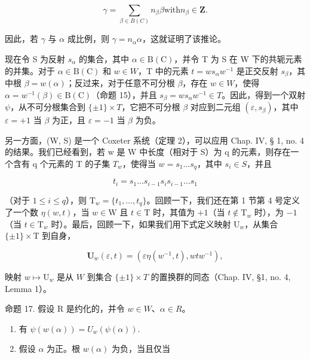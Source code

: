 \[
\gamma = \sum_ {\beta \in B (C)} n _ {\beta} \beta \text {with} n _ {\beta} \in \mathbf {Z}.
\]

因此，若 \(\gamma\) 与 \(\alpha\) 成比例，则 \(\gamma = n_{\alpha}\alpha\)，这就证明了该推论。

现在令 S 为反射 \(s_{\alpha}\) 的集合，其中 \(\alpha \in \mathrm{B}(\mathrm{C})\)，并令 T 为 S 在 W 下的共轭元素的并集。对于 \(\alpha \in \mathrm{B}(\mathrm{C})\) 和 \(w \in W\)，T 中的元素 \(t = ws_{\alpha}w^{-1}\) 是正交反射 \(s_{\beta}\)，其中根 \(\beta = w(\alpha)\)；反过来，对于任意不可分根 \(\beta\)，存在 \(w \in W\)，使得 \(\alpha = w^{-1}(\beta) \in \mathrm{B}(\mathrm{C})\)（命题 15），并且 \(s_{\beta} = ws_{\alpha}w^{-1} \in T\)。因此，得到一个双射 \(\psi\)，从不可分根集合到 \(\{\pm1\} \times T\)，它把不可分根 \(\beta\) 对应到二元组 \((\varepsilon, s_{\beta})\)，其中 \(\varepsilon = +1\) 当 \(\beta\) 为正，且 \(\varepsilon = -1\) 当 \(\beta\) 为负。

另一方面，(W, S) 是一个 Coxeter 系统（定理 2），可以应用 Chap. IV, § 1, no. 4 的结果。我们已经看到，若 w 是 W 中长度（相对于 S）为 q 的元素，则存在一个含有 q 个元素的 T 的子集 \(T_{w}\)，使得当 \(w = s_{1} \ldots s_{q}\)，其中 \(s_{i} \in S\)，并且

\[
t _ {i} = s _ {1} \dots s _ {i - 1} s _ {i} s _ {i - 1} \dots s _ {1}
\]

（对于 \(1 \leqslant i \leqslant q\)），则 \(\mathrm{T}_w = \{t_1, \ldots, t_q\}\)。回顾一下，我们还在第 1 节第 4 号定义了一个数 \(\eta(w, t)\)，当 \(w \in \mathrm{W}\) 且 \(t \in \mathrm{T}\) 时，其值为 \(+1\)（当 \(t \notin \mathrm{T}_w\) 时），为 \(-1\)（当 \(t \in \mathrm{T}_w\) 时）。最后，回顾一下，如果我们用下式定义映射 \(\mathrm{U}_w\)，从集合 \(\{\pm 1\} \times \mathrm{T}\) 到自身，

\[
\mathbf {U} _ {w} (\varepsilon , t) = (\varepsilon \eta (w ^ {- 1}, t), w t w ^ {- 1}),
\]

映射 \(w \mapsto \mathrm{U}_w\) 是从 \(W\) 到集合 \(\{\pm 1\} \times T\) 的置换群的同态（Chap. IV, §1, no. 4, Lemma 1）。

命题 17. 假设 R 是约化的，并令 \(w \in W\)、\(\alpha \in R\)。

\begin{enumerate}
\def\labelenumi{(\roman{enumi})}
\item
有 \(\psi(w(\alpha)) = U_w(\psi(\alpha)).\)
\item
  假设 \(\alpha\) 为正。根 \(w(\alpha)\) 为负，当且仅当
\end{enumerate}

